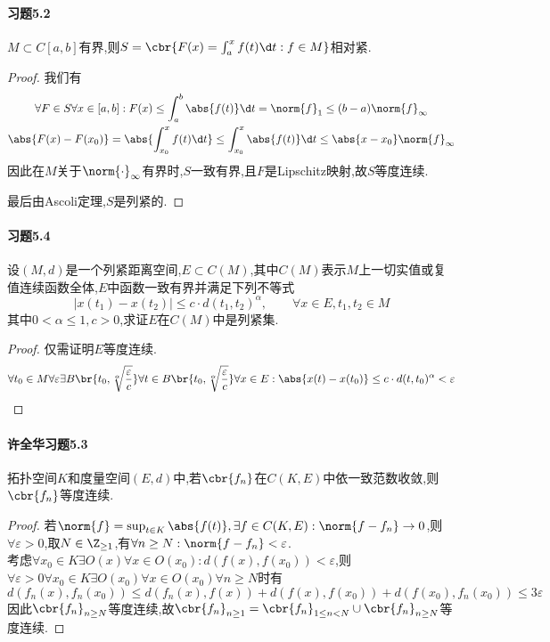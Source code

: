 \documentclass{article}
\begin{document}
\paragraph{习题5.2}$M\subset C[a,b]$有界,则$S=\cbr{F(x)=\int_a^x f(t)\d t:f\in M}$相对紧.
\begin{proof}
    我们有$$\begin{gathered}
        \forall F\in S\forall x\in [a,b]:F(x)\leq \int_a^b\abs{f(t)}\d t=\norm{f}_1\leq (b-a)\norm{f}_\infty\\
        \abs{F(x)-F(x_0)}=\abs{\int_{x_0}^x f(t)\d t}\leq \int_{x_0}^x\abs{f(t)}\d t\leq \abs{x-x_0}\norm{f}_\infty
    \end{gathered}$$
    因此在$M$关于$\norm{\cdot}_\infty$有界时,$S$一致有界,且$F$是Lipschitz映射,故$S$等度连续.

    最后由Ascoli定理,$S$是列紧的.
\end{proof}

\paragraph{习题5.4}设$(M,d)$是一个列紧距离空间,$E\subset C(M)$,其中$C(M)$表示$M$上一切实值或复值连续函数全体,$E$中函数一致有界并满足下列不等式
$$|x(t_1)-x(t_2)|\leq c\cdot d(t_1,t_2)^\alpha,\qquad \forall x\in E, t_1,t_2\in M$$
其中$0<\alpha\leq 1,c>0$,求证$E$在$C(M)$中是列紧集.
\begin{proof}
    仅需证明$E$等度连续.$$\forall t_0\in M\forall\varepsilon\exists B\br{t_0,\sqrt[\alpha]{\frac{\varepsilon}{c}}}\forall t\in B\br{t_0,\sqrt[\alpha]{\frac{\varepsilon}{c}}}\forall x\in E:\abs{x(t)-x(t_0)}\leq c\cdot d(t,t_0)^\alpha<\varepsilon$$
\end{proof}

\paragraph{许全华习题5.3}拓扑空间$K$和度量空间$(E,d)$中,若$\cbr{f_n}$在$C(K,E)$中依一致范数收敛,则$\cbr{f_n}$等度连续.
\begin{proof}
    若$\norm{f}=\sup_{t\in K}\abs{f(t)}, \exists f\in C(K,E):\norm{f-f_n}\to 0$,则$\forall \varepsilon>0$,取$N\in \Z_{\geq 1}$,有$\forall n\geq N:\norm{f-f_n}<\varepsilon$.\\
    考虑$\forall x_0\in K\exists O(x)\forall x\in O(x_0):d(f(x),f(x_0))<\varepsilon$,则$\forall \varepsilon>0\forall x_0\in K\exists O(x_0)\forall x\in O(x_0)\forall n\geq N$时有$$d(f_n(x),f_n(x_0))\leq d(f_n(x),f(x))+d(f(x),f(x_0))+d(f(x_0),f_n(x_0))\leq 3\varepsilon$$
    因此$\cbr{f_n}_{n\geq N}$等度连续,故$\cbr{f_n}_{n\geq 1}=\cbr{f_n}_{1\leq n< N}\cup \cbr{f_n}_{n\geq N}$等度连续.
\end{proof}
\end{document}
